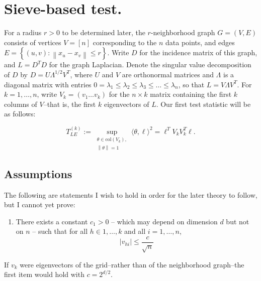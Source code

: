 \documentclass{article}
\newcommand{\norm}[1]{\left\lVert#1\right\rVert}
\newcommand{\abs}[1]{\left \lvert #1 \right \rvert}
\newcommand{\set}[1]{\left\{#1\right\}}
\newcommand{\dotp}[2]{\langle #1, #2 \rangle}
\newcommand{\1}{\mathbb{I}}
\theoremstyle{alden}
\theoremstyle{aldenthm}
\theoremstyle{definition}
\theoremstyle{remark}
\begin{document}
\section{Sieve-based test.}

For a radius $r > 0$ to be determined later, the $r$-neighborhood graph $G = (V,E)$ consists of vertices $V = [n]$ corresponding to the $n$ data points, and edges $E = \set{(u,v): \norm{x_u - x_v} \leq r}$. Write $D$ for the incidence matrix of this graph, and $L = D^T D$ for the graph Laplacian. Denote the singular value decomposition of $D$ by $D = U \Lambda^{1/2} V^T$, where $U$ and $V$ are orthonormal matrices and $\Lambda$ is a diagonal matrix with entries $0 = \lambda_1 \leq \lambda_2 \leq \lambda_3 \leq \ldots \leq \lambda_n$, so that $L = V \Lambda V^T$. For $k = 1,\ldots,n$, write $V_k = (v_1 \ldots v_k)$ for the $n \times k$ matrix containing the first $k$ columns of $V$--that is, the first $k$ eigenvectors of $L$. Our first test statistic will be as follows:

\begin{equation}
\label{eqn: laplacian_eigenmaps_statistic}
T_{LE}^{(k)} := \sup_{\substack{\theta \in \mathrm{col}(V_k), \\ \norm{\theta} = 1} } \dotp{\theta}{\ell}^2 = \ell^T V_k V_k^T \ell.
\end{equation}

\subsection{Assumptions}
The following are statements I wish to hold in order for the later theory to follow, but I cannot yet prove:
\begin{enumerate}
	\item There exists a constant $c_1 > 0$ -- which may depend on dimension $d$ but not on $n$ --  such that for all $h \in 1, \ldots,k$ and all $i = 1,\ldots,n$, 
	\begin{equation}
	\label{eqn: asmp_1}
	\abs{v_{hi}} \leq \frac{c}{\sqrt{n}}
	\end{equation}
\end{enumerate}

If $v_k$ were eigenvectors of the grid--rather than of the neighborhood graph--the first item would hold with $c = 2^{d/2}$.
\end{document}
